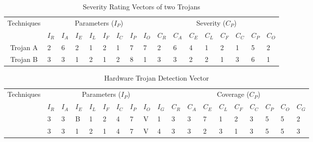 \begin{table}[h]
	\centering
	\caption{Severity Rating Vectors of two Trojans}
	\label{tbl:severityTable}
	\renewcommand{\arraystretch}{1.2}
	\begin{tabular}{|c|p{0.3mm}p{0.3mm}p{0.3mm}p{0.3mm}p{0.3mm}p{0.3mm}p{0.3mm}p{2mm}|p{0.3mm}p{0.3mm}p{0.3mm}p{0.3mm}p{0.3mm}p{0.3mm}p{0.3mm}p{2mm}|}
		\hline
		Techniques & \multicolumn{8}{c|}{Parameters ($I_P$)} & \multicolumn{8}{c|}{Severity ($C_P$)} \\ \cline{2-17} 
		& $I_R$ & $I_A$ & $I_E$ & $I_L$ & $I_F$ & $I_C$ & $I_P$ & $I_O$ & $C_R$ & $C_A$ & $C_E$ & $C_L$ & $C_F$ & $C_C$ & $C_P$ & $C_O$ \\ \hline
		Trojan A & 2 & 6 & 2 & 1 & 2 & 1 & 7 & 7 & 2 & 6 & 4 & 1 & 2 & 1 & 5 & 2 \\ \cline{1-1}
		Trojan B & 3 & 3 & 1 & 2 & 1 & 2 & 8 & 1 & 3 & 3 & 2 & 2 & 1 & 3 & 6 & 1 \\ \hline
	\end{tabular}
\end{table}
\begin{table}[h]
	\centering
	\caption{Hardware Trojan Detection Vector}
	\label{tbl:detectionTable}
	\renewcommand{\arraystretch}{1.2}
	\begin{tabular}{|c|p{1mm}p{1mm}p{1mm}p{1mm}p{1mm}p{1mm}p{1mm}p{1mm}p{2mm}|p{1mm}p{1mm}p{1mm}p{1mm}p{1mm}p{1mm}p{1mm}p{1mm}p{2.5mm}|}
		\hline
		Techniques & \multicolumn{9}{c|}{Parameters ($I_P$)} & \multicolumn{9}{c|}{Coverage ($C_P$)} \\ \cline{2-19} 
		& $I_R$ & $I_A$ & $I_E$ & $I_L$ & $I_F$ & $I_C$ & $I_P$ & $I_O$ & $I_G$ & $C_R$ & $C_A$ & $C_E$ & $C_L$ & $C_F$ & $C_C$ & $C_P$ & $C_O$ & $C_G$ \\ \hline
		\cite{detectionMethod1} & 3 & 3 & B & 1 & 2 & 4 & 7 & V & 1 & 3 & 3 & 7 & 1 & 2 & 3 & 5 & 5 & 2 \\ \cline{1-1}
		\cite{detectionMethod2} & 3 & 3 & 1 & 2 & 1 & 4 & 7 & V & 4 & 3 & 3 & 2 & 3 & 1 & 3 & 5 & 5 & 3 \\ \hline
	\end{tabular}
\end{table}

